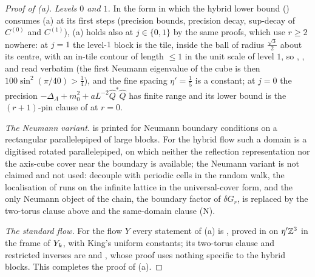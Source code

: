 \begin{proof}[Proof of (a)]
\emph{Levels $0$ and $1$.} In the form in which the hybrid lower bound () consumes (a) at its first steps (precision bounds, precision decay, sup-decay of $C^{(0)}$ and $C^{(1)}$), (a) holds also at $j\in\{0,1\}$ by the same proofs, which use $r\ge2$ nowhere: at $j=1$ the level-$1$ block is the tile, inside the ball of radius $\frac{\sqrt3}2$ about its centre, with an in-tile contour of length $\le1$ in the unit scale of level $1$, so , ,  and  read verbatim (the first Neumann eigenvalue of the cube is then $100\sin^2(\pi/40)>\frac14$), and the fine spacing $\eta'=\frac15$ is a constant; at $j=0$ the precision $-\Delta_A+m_0^2+aL^{-2}\hat Q^*\hat Q$ has finite range and its lower bound is the $(r+1)$-pin clause of  at $r=0$.

\emph{The Neumann variant.} \cite[Thm.~3.3]{K1} is printed for Neumann boundary conditions on a rectangular parallelepiped of large blocks. For the hybrid flow such a domain is a digitised rotated parallelepiped, on which neither the reflection representation \cite[(2.42)]{Ba4} nor the axis-cube cover near the boundary is available; the Neumann variant is not claimed and not used: \cite[\S\S4--5]{K2} decouple with periodic cells in the random walk, the localisation of  runs on the infinite lattice in the universal-cover form, and the only Neumann object of the chain, the boundary factor of $\delta G_r$, is replaced by the two-torus clause above and the same-domain clause (N).

\emph{The standard flow.} For the flow $Y$ every statement of (a) is \cite[Thm.~3.3]{K1}, proved in \cite{Ba4} on $\eta'\mathbb Z^3$ in the frame of $Y_k$, with King's uniform constants; its two-torus clause and restricted inverses are \cite[Prop.~5.6]{K2} and , whose proof uses nothing specific to the hybrid blocks. This completes the proof of (a).
\end{proof}
